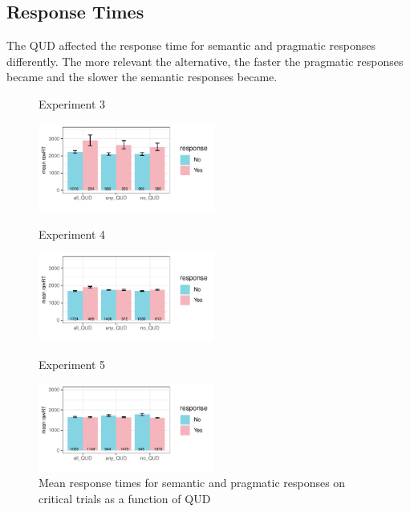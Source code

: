 \documentclass[12pt]{article}
\begin{document}
\pagebreak
\subsection*{Response Times}

The QUD affected the response time for semantic and pragmatic responses differently. The more relevant the alternative, the faster the pragmatic responses became and the slower the semantic responses became.\\

\begin{figure}[!ht] 
    \begin{minipage}{.32\textwidth}
        \caption*{Experiment 3}
        \includegraphics[height=2.9cm]{img/exp3_response_time.pdf}
    \end{minipage}%
    \begin{minipage}{.32\textwidth}
        \caption*{Experiment 4}
        \includegraphics[height=2.9cm]{img/exp4_response_time_scale.pdf}
    \end{minipage}%
    \begin{minipage}{.32\textwidth}
        \caption*{Experiment 5}
        \includegraphics[height=2.9cm]{img/exp5_response_time_scale.pdf}
    \end{minipage}%
    \caption{Mean response times for semantic and pragmatic responses on critical trials as a function of QUD}
\end{figure}
\end{document}
